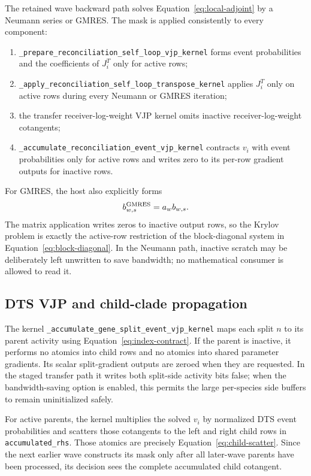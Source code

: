 \documentclass[11pt]{article}
\newcommand{\kernel}[1]{\nolinkurl{#1}}
\newcommand{\code}[1]{\nolinkurl{#1}}
\begin{document}
The retained wave backward path solves Equation~\eqref{eq:local-adjoint} by a
Neumann series or GMRES.  The mask is applied consistently to every component:
\begin{enumerate}
  \item \kernel{_prepare_reconciliation_self_loop_vjp_kernel} forms event
        probabilities and the coefficients of $J_i^T$ only for active rows;
  \item \kernel{_apply_reconciliation_self_loop_transpose_kernel} applies $J_i^T$ only on
        active rows during every Neumann or GMRES iteration;
  \item the transfer receiver-log-weight VJP kernel omits inactive
        receiver-log-weight cotangents;
  \item \kernel{_accumulate_reconciliation_event_vjp_kernel} contracts $v_i$
        with event probabilities only for active rows and writes zero to its
        per-row gradient outputs for inactive rows.
\end{enumerate}
For GMRES, the host also explicitly forms
\begin{equation}
  b^{\rm GMRES}_{w,s}=a_w b_{w,s}.
\end{equation}
The matrix application writes zeros to inactive output rows, so the Krylov
problem is exactly the active-row restriction of the block-diagonal system in
Equation~\eqref{eq:block-diagonal}.  In the Neumann path, inactive scratch may
be deliberately left unwritten to save bandwidth; no mathematical consumer
is allowed to read it.

\subsection{DTS VJP and child-clade propagation}

The kernel \kernel{_accumulate_gene_split_event_vjp_kernel} maps each split $n$ to
its parent activity using Equation~\eqref{eq:index-contract}.  If the parent is
inactive, it performs no atomics into child rows and no atomics into shared
parameter gradients.  Its scalar split-gradient outputs are zeroed when they
are requested.  In the staged transfer path it writes both split-side activity
bits false; when the bandwidth-saving option is enabled, this permits the
large per-species side buffers to remain uninitialized safely.

For active parents, the kernel multiplies the solved $v_i$ by normalized DTS
event probabilities and scatters those cotangents to the left and right child
rows in \code{accumulated\_rhs}.  Those atomics are precisely
Equation~\eqref{eq:child-scatter}.  Since the next earlier wave constructs its
mask only after all later-wave parents have been processed, its decision sees
the complete accumulated child cotangent.
\end{document}
